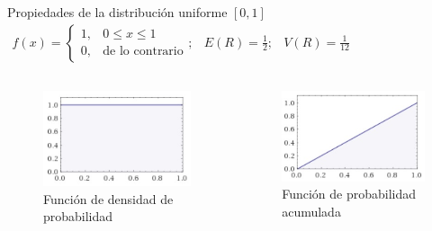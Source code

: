 \begin{frame}{Propiedades de la distribución uniforme $\left[0,1\right]$}
    $\begin{array}{ccc}
        f(x)=\left\{\begin{array}{cl}
        1, & 0\leq x \leq 1  \\
        0, & \text{de lo contrario}
    \end{array}\right.; & E(R)=\frac{1}{2}; & V(R)=\frac{1}{12}
    \end{array}$
    \begin{columns}
        \begin{column}{0.5\textwidth}
            \begin{figure}
                \centering
                \includegraphics[width=5cm]{images/uniform_pdf.jpg}
                \caption{Función de densidad de probabilidad}
                \label{fig:pdf}
            \end{figure}
        \end{column}
        \begin{column}{0.5\textwidth}
            \begin{figure}
                \centering
                \includegraphics[width=5cm]{images/uniform_cdf.jpg}
                \caption{Función de probabilidad acumulada}
                \label{fig:cdf}
            \end{figure}
        \end{column}
    \end{columns}
\end{frame}
